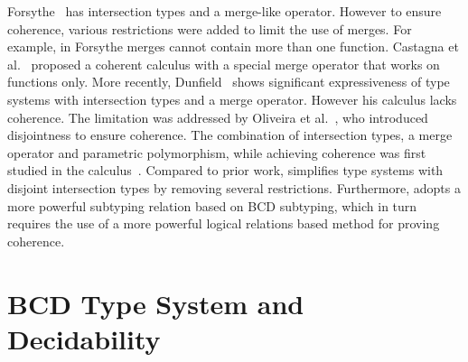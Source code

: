 Forsythe~\citep{reynolds1988preliminary} has intersection types and a merge-like
operator. However to ensure coherence, various restrictions were added to limit
the use of merges. For example, in Forsythe merges cannot contain more than one
function. Castagna et al.~\citep{Castagna_1992} proposed a coherent calculus
with a special merge operator that works on functions only. More recently,
Dunfield~\citep{dunfield2014elaborating} shows significant expressiveness of
type systems with intersection types and a merge operator. However his calculus
lacks coherence. The limitation was addressed by Oliveira et
al.~\citep{oliveira2016disjoint}, who introduced disjointness to ensure
coherence. The combination of intersection types, a merge operator and
parametric polymorphism, while achieving coherence was first studied in the
\fname calculus~\citep{alpuimdisjoint}. Compared to prior work, \namee simplifies
type systems with disjoint intersection types by removing several restrictions.
Furthermore, \namee adopts a more powerful subtyping relation based on BCD
subtyping, which in turn requires the use of a more powerful logical relations
based method for proving coherence.





\section {BCD Type System and Decidability}

